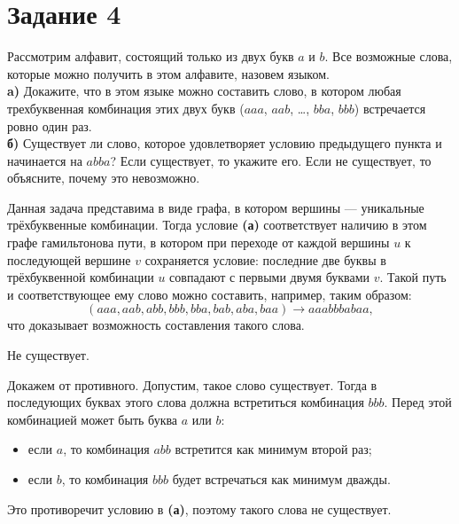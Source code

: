 \documentclass[a4paper,12pt]{article}
\begin{document}
\section*{Задание 4}
Рассмотрим алфавит, состоящий только из двух букв $a$ и $b$. Все возможные слова, которые можно получить в этом алфавите, назовем языком.\\
{\bf a)} Докажите, что в этом языке можно составить слово, в котором любая трехбуквенная комбинация этих двух букв ($aaa$, $aab$, \ldots, $bba$, $bbb$) встречается ровно один раз.\\
{\bf б)} Существует ли слово, которое удовлетворяет условию предыдущего пункта и начинается на $abba$? Если существует, то укажите его. Если не существует, то объясните, почему это невозможно.\par
\vspace{5pt}
 \par
{} Данная задача представима в виде графа, в котором вершины --- уникальные трёхбуквенные комбинации. Тогда условие {\bf (а)} соответствует наличию в этом графе гамильтонова пути, в котором при переходе от каждой вершины $u$ к последующей вершине $v$ сохраняется условие: последние две буквы в трёхбуквенной комбинации $u$ совпадают с первыми двумя буквами $v$. Такой путь и соответствующее ему слово можно составить, например, таким образом:
$$(aaa,aab,abb,bbb,bba,bab,aba,baa)\rightarrow aaabbbabaa,$$
что доказывает возможность составления такого слова.\par
{} Не существует.\par 
{} Докажем от противного. Допустим, такое слово существует. Тогда в последующих буквах этого слова должна встретиться комбинация $bbb$. Перед этой комбинацией может быть буква $a$ или $b$:
\begin{itemize}
\item если $a$, то комбинация $abb$ встретится как минимум второй раз;
\item если $b$, то комбинация $bbb$ будет встречаться как минимум дважды.
\end{itemize}
Это противоречит условию в {\bf (а)}, поэтому такого слова не существует.
\end{document}
